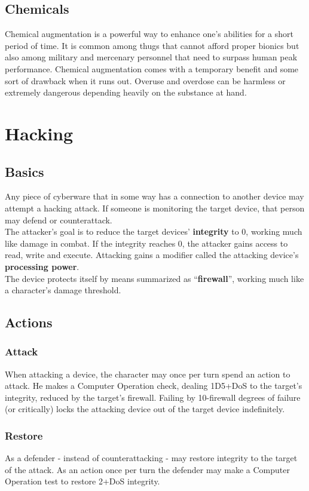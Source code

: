 \documentclass[12pt,a4paper,openany]{book}
\begin{document}
	\section{Chemicals}
	Chemical augmentation is a powerful way to enhance one’s abilities for a short period of time. It is common among thugs that cannot afford proper bionics but also among military and mercenary personnel that need to surpass human peak performance. Chemical augmentation comes with a temporary benefit and some sort of drawback when it runs out. Overuse and overdose can be harmless or extremely dangerous depending heavily on the substance at hand.

	\chapter{Hacking}
	\section{Basics}
	Any piece of cyberware that in some way has a connection to another device may attempt a hacking attack. If someone is monitoring the target device, that person may defend or counterattack.\\
	The attacker’s goal is to reduce the target devices’ \textbf{integrity} to 0, working much like damage in combat. If the integrity reaches 0, the attacker gains access to read, write and execute. Attacking gains a modifier called the attacking device’s \textbf{processing power}.\\
	The device protects itself by means summarized as “\textbf{firewall}”, working much like a character’s damage threshold.
	\section{Actions}
	\subsection*{Attack}
	When attacking a device, the character may once per turn spend an action to attack. He makes a Computer Operation check, dealing 1D5+DoS to the target’s integrity, reduced by the target’s firewall. Failing by 10-firewall degrees of failure (or critically) locks the attacking device out of the target device indefinitely.
	\subsection*{Restore}
	As a defender - instead of counterattacking - may restore integrity to the target of the attack. As an action once per turn the defender may make a Computer Operation test to restore 2+DoS integrity.
\end{document}
